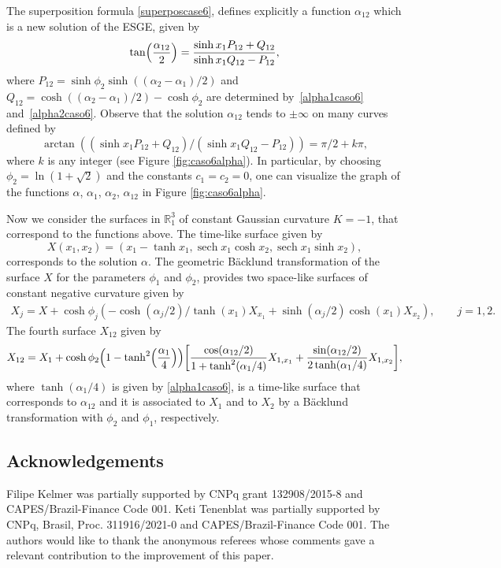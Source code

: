\documentclass[pdftex]{sigma}
\numberwithin{equation}{section}
\newcommand{\sech}{\operatorname{sech}}
\begin{document}
\begin{Example}
 The superposition formula \eqref{superposcase6}, defines explicitly a function $\alpha_{12}$ which is a new solution of the ESGE, given by
\[
\tan \Bigl(\frac{\alpha_{12}}{2}\Bigr)= \frac{\sinh x_1 P_{12}+Q_{12}}{\sinh x_1Q_{12}-P_{12}},
\]
where $P_{12}=\sinh\phi_2 \sinh((\alpha_2-\alpha_1)/2)$ and $Q_{12}=\cosh((\alpha_2-\alpha_1)/2)-\cosh\phi_2$ are determined by~\eqref{alpha1caso6} and~\eqref{alpha2caso6}. Observe that the solution
$\alpha_{12}$ tends to $\pm\infty$ on many curves defined by
\[
\arctan( (\sinh x_1 P_{12}+Q_{12})/(\sinh x_1Q_{12}-P_{12}))=\pi/2+k\pi,
\]
where $k$ is any integer (see Figure \ref{fig:caso6alpha}).
In particular, by choosing $\phi_2=\ln(1+\sqrt{2})$ and the constants $c_1=c_2=0$, one can visualize
the graph of the functions $\alpha$, $\alpha_1$, $\alpha_2$, $\alpha_{12}$ in Figure \ref{fig:caso6alpha}.
\end{Example}

Now we consider the surfaces in ${\mathbb{R}}^3_1$ of constant Gaussian curvature $K=-1$, that correspond to the functions above. The time-like surface given by
\begin{equation}\label{superfESGE}
X(x_1,x_2)=(x_1-\tanh x_1, \sech x_1\cosh x_2, \sech x_1\sinh x_2),
\end{equation}
corresponds to the solution $\alpha$. The geometric B\"acklund transformation of the surface $X$ for the parameters $\phi_1$ and $\phi_2$, provides two space-like surfaces of constant negative curvature
given by
\begin{gather*}
X_j=X+\cosh \phi_j(-\cosh(\alpha_j/2)/\tanh(x_1)X_{x_1}+ \sinh(\alpha_j/2)\cosh(x_1)X_{x_2}) ,\qquad j=1,2.
\end{gather*}
The fourth surface $X_{12}$ given by
\[
X_{12}=X_1+ \cosh\phi_2 \Bigl( 1-\tanh^2\Bigl(\frac{\alpha_1}{4}\Bigr) \Bigr) \biggl[ \dfrac{ \cos(\alpha_{12}/2) } {1+\tanh^2({\alpha_1}/{4})} X_{1,x_1}+ \dfrac{ \sin(\alpha_{12}/2) } {2 \tanh({\alpha_1}/{4})} X_{1,x_2} \biggr],
\]
where $ \tanh(\alpha_1/{4})$ is given by \eqref{alpha1caso6}, is a time-like surface that corresponds to $\alpha_{12}$ and it is associated to $X_1$ and to $X_2$ by a B\"acklund transformation with $\phi_2$ and $\phi_1$, respectively.


\subsection*{Acknowledgements}
Filipe Kelmer was partially supported by CNPq grant 132908/2015-8 and
CAPES/Brazil-Finance Code 001. Keti Tenenblat was partially supported by CNPq, Brasil, Proc. 311916/2021-0 and CAPES/Brazil-Finance Code 001.
 The authors would like to thank the anonymous referees whose comments gave a relevant contribution to the improvement of this paper.
\end{document}
